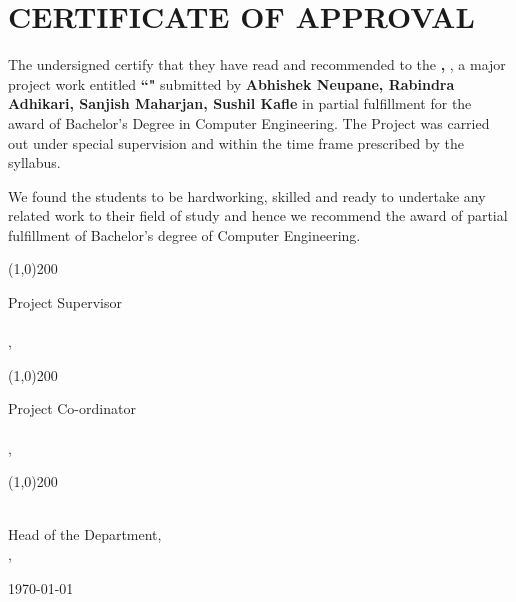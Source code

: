 \section*{CERTIFICATE OF APPROVAL}

\vspace{0.5cm}

The undersigned certify that they have read and recommended to the \textbf{\thedepartment,  \thecampus}, a major
project work entitled \textbf{“\thetitle"} submitted by \textbf{Abhishek Neupane, Rabindra Adhikari, Sanjish Maharjan, Sushil Kafle} in partial fulfillment for the award of Bachelor’s
Degree in Computer Engineering. The Project was carried out
under special supervision and within the time frame prescribed by the syllabus.

\vspace{1cm}

\noindent We found the students to be hardworking, skilled and ready to undertake any related
work to their field of study and hence we recommend the award of partial fulfillment
of Bachelor’s degree of Computer Engineering.

\vspace{1cm}

\noindent \line(1,0){200}

\noindent Project Supervisor \\
\thesupervisor \\
\thedepartment, \thecampus



\vspace{1cm}

\noindent \line(1,0){200}

\noindent Project Co-ordinator \\
\theprogramcoordinator \\
\thedepartment, \thecampus

\vspace{1cm}

\noindent \line(1,0){200}

\noindent \theHOD \\
Head of the Department, \\
\thedepartment, \thecampus

\vspace{1cm}

\noindent \today
